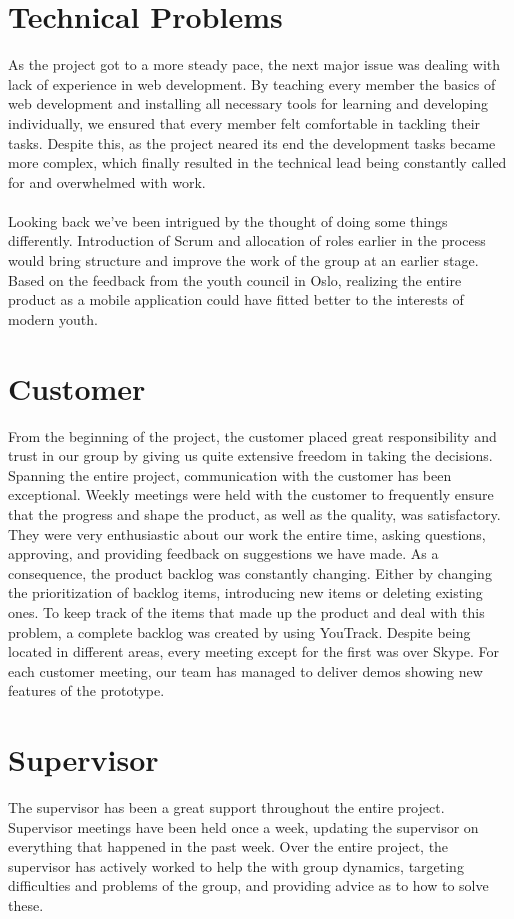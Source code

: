 \section{Technical Problems}
As the project got to a more steady pace, the next major issue was dealing with lack of experience in web development. By teaching every member the basics of web development and installing all necessary tools for learning and developing individually, we ensured that every member felt comfortable in tackling their tasks. Despite this, as the project neared its end the development tasks became more complex, which finally resulted in the technical lead being constantly called for and overwhelmed with work. 

\paragraph{} Looking back we’ve been intrigued by the thought of doing some things differently. Introduction of Scrum and allocation of roles earlier in the process would bring structure and improve the work of the group at an earlier stage. Based on the feedback from the youth council in Oslo, realizing the entire product as a mobile application could have fitted better to the interests of modern youth.

\section{Customer}
From the beginning of the project, the customer placed great responsibility and trust in our group by giving us quite extensive freedom in taking the decisions. Spanning the entire project, communication with the customer has been exceptional. Weekly meetings were held with the customer to frequently ensure that the progress and shape the product, as well as the quality, was satisfactory. They were very enthusiastic about our work the entire time, asking questions, approving, and providing feedback on suggestions we have made. As a consequence, the product backlog was constantly changing. Either by changing the prioritization of backlog items, introducing new items or deleting existing ones. To keep track of the items that made up the product and deal with this problem, a complete backlog was created by using YouTrack. Despite being located in different areas, every meeting except for the first was over Skype. For each customer meeting, our team has managed to deliver demos showing new features of the prototype. 

\section{Supervisor} 
The supervisor has been a great support throughout the entire project. Supervisor meetings have been held once a week, updating the supervisor on everything that happened in the past week. Over the entire project, the supervisor has actively worked to help the with group dynamics, targeting difficulties and problems of the group, and providing advice as to how to solve these. 

